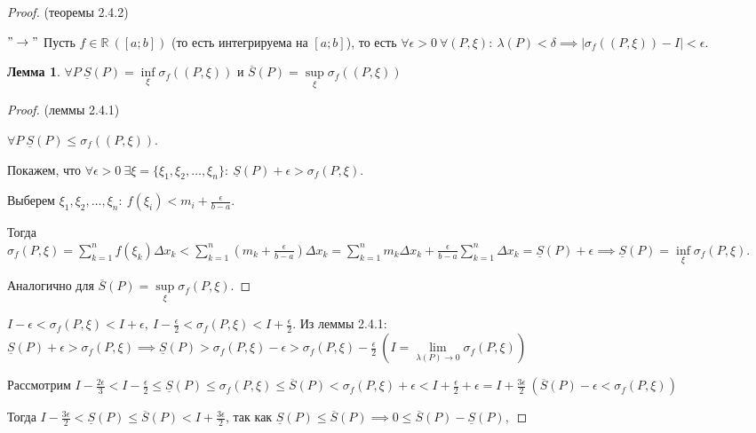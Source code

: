 \documentclass{report}
\theoremstyle{definition}
\newtheorem{lemma}{Лемма}[section]
\begin{document}
\begin{proof}
  (теоремы 2.4.2)

  $"\rightarrow"$ Пусть $f\in\mathbb{R} \ ([a;b])$ (то есть интегрируема на $[a;b]$), то есть $\forall \epsilon > 0 \
    \forall (P,\xi): \ \lambda (P) < \delta \implies | \sigma_{f} ((P,\xi)) - I | < \epsilon$.

  \begin{lemma}
    $\forall P \ \underline{S}(P) = \underset{\xi}{\inf} \sigma_{f}((P,\xi))$ и $\overline{S}(P)=\underset{\xi}{\sup}
      \sigma_{f}((P,\xi))$
  \end{lemma}

  \begin{proof}
    (леммы 2.4.1)

    $\forall P \ \underline{S}(P) \leqslant \sigma_{f}((P,\xi))$.

    Покажем, что $\forall \epsilon > 0 \ \exists \xi = \{\xi_{1},\xi_{2},\ldots,\xi_{n}\}: \ \underline{S}(P) + \epsilon
      > \sigma_{f}(P,\xi)$.

    Выберем $\xi_{1},\xi_{2},\ldots,\xi_{n}: \ f(\xi_{i}) < m_{i} + \frac{\epsilon}{b-a}$.

    Тогда $\sigma_{f}(P,\xi) = \sum_{k=1}^{n}f(\xi_{k})\Delta x_{k} < \sum_{k=1}^{n}(m_{k} + \frac{\epsilon}{b-a})
      \Delta x_{k} = \sum_{k=1}^{n}m_{k}\Delta x_{k} + \frac{\epsilon}{b-a}\sum_{k=1}^{n}\Delta x_{k} = \underline{S}(P)
      + \epsilon \implies \underline{S}(P) = \underset{\xi}{\inf}\sigma_{f}(P,\xi)$.

    Аналогично для $\overline{S}(P) = \underset{\xi}{\sup}\sigma_{f}(P,\xi)$.
  \end{proof}

  $I - \epsilon < \sigma_{f}(P,\xi) < I + \epsilon, \ I - \frac{\epsilon}{2} < \sigma_{f}(P,\xi) < I + \frac
    {\epsilon}{2}$. Из леммы 2.4.1: $\underline{S}(P) + \epsilon > \sigma_{f}(P,\xi) \implies \underline{S}(P) >
    \sigma_{f} (P,\xi) - \epsilon > \sigma_{f}(P,\xi) - \frac{\epsilon}{2} \ (I = \underset{\lambda
      (P)\rightarrow0}{\lim}\sigma_{f}(P,\xi))$

  Рассмотрим $I-\frac{2\epsilon}{3} < I - \frac{\epsilon}{2} \leqslant \underline{S}(P) \leqslant \sigma_{f}(P,\xi)
    \leqslant \overline{S}(P) < \sigma_{f}(P,\xi) + \epsilon < I + \frac{\epsilon}{2} + \epsilon = I + \frac{3\epsilon}{2}
    \ (\overline{S}(P) - \epsilon < \sigma_{f}(P,\xi))$

  Тогда $I - \frac{3\epsilon}{2} < \underline{S}(P) \leqslant \overline{S}(P) < I + \frac{3\epsilon}{2}$, так как
  $\underline{S}(P) \leqslant \overline{S}(P) \implies 0 \leqslant \overline{S}(P) - \underline{S}(P),$


\end{proof}
\end{document}
